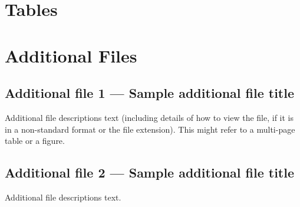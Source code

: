 \documentclass{bmcart}
\begin{document}
\begin{backmatter}

\section*{Tables}



\section*{Additional Files}
  \subsection*{Additional file 1 --- Sample additional file title}
    Additional file descriptions text (including details of how to
    view the file, if it is in a non-standard format or the file extension).  This might
    refer to a multi-page table or a figure.

  \subsection*{Additional file 2 --- Sample additional file title}
    Additional file descriptions text.


\end{backmatter}
\end{document}
